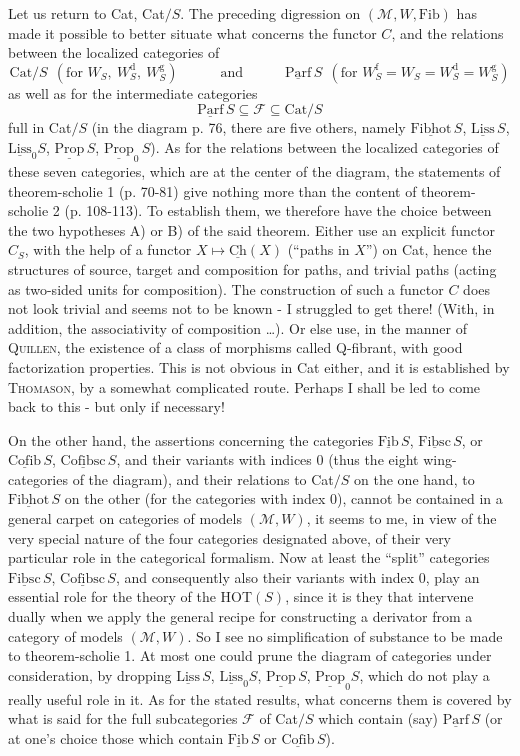 \documentclass[11pt]{article}
\newcommand{\printedpage}[1]{\marginpar{\footnotesize p.~#1}}
\newcommand{\msp}[1]{\marginpar{\footnotesize [#1]}}
\newcommand{\Fib}{\underline{\mathrm{Fib}}\,}
\newcommand{\Fibsc}{\underline{\mathrm{Fibsc}}\,}
\newcommand{\Cofib}{\underline{\mathrm{Cofib}}\,}
\newcommand{\Cofibsc}{\underline{\mathrm{Cofibsc}}\,}
\newcommand{\Fibhot}{\underline{\mathrm{Fibhot}}\,}
\newcommand{\Parf}{\underline{\mathrm{Parf}}\,}
\newcommand{\Liss}{\underline{\mathrm{Liss}}}
\newcommand{\Prop}{\underline{\mathrm{Prop}}}
\newcommand{\Cat}{\mathrm{Cat}}
\newcommand{\M}{\mathcal{M}}
\begin{document}
Let us return to Cat, Cat$/S$. The preceding digression on $(\M, W, \mathrm{Fib})$ has made it possible to better situate what concerns the functor $C$, and the relations between the localized categories of
\[\Cat/S \ \ (\text{for } W_S,\ W_S^{\mathrm{d}},\ W_S^{\mathrm{g}}) \qquad\quad \text{and} \qquad\quad \Parf S \ \ (\text{for } W_S^{\mathrm{f}} = W_S = W_S^{\mathrm{d}} = W_S^{\mathrm{g}})\]
as well as for the intermediate categories
\[\Parf S \subseteq \mathcal{F} \subseteq \Cat/S\]
full in Cat$/S$ (in the diagram p. 76, there are five others, namely $\Fibhot S$, $\Liss\,S$, $\Liss_0 S$, $\Prop\,S$, $\Prop_0\,S$). As for the relations between the localized categories of these seven categories, which are at the center of the diagram, the statements of theorem-scholie 1 (p. 70-81) give nothing more than the content of theorem-scholie 2 (p. 108-113). To establish them, we therefore have the choice between the two hypotheses A) or B) of the said theorem. Either use an explicit functor $C_S$, with the help of a
\msp{page 114}
functor $X \longmapsto \underline{\mathrm{Ch}}(X)$ (``paths in $X$'') on Cat, hence the structures of source, target and composition for paths, and trivial paths (acting as two-sided units for composition). The construction of such a functor $C$ does not look trivial and seems not to be known - I struggled to get there! (With, in addition, the associativity of composition \ldots). Or else use, in the manner of \textsc{Quillen}, the existence of a class of morphisms called Q-fibrant, with good factorization properties. This is not obvious in Cat either, and it is established by \textsc{Thomason}, by a somewhat complicated route. Perhaps I shall be led to come back to this - but only if necessary! %

On the other hand, the assertions concerning the categories $\Fib S$, $\Fibsc S$, or $\Cofib S$, $\Cofibsc S$, and their variants with indices 0 (thus the eight wing-categories of the diagram), and their relations to Cat$/S$ on the one hand, to $\Fibhot S$ on the other (for the categories with index 0), cannot be contained in a general carpet on categories of models $(\M, W)$, it seems to me, in view of the very special nature of the four categories designated above, of their very particular role in the categorical formalism. Now at least the ``split'' categories $\Fibsc S$, $\Cofibsc S$, and consequently also their variants with index 0, play an essential role for the theory of the HOT$(S)$, since it is they that
\msp{page 115}
intervene dually when we apply the general recipe for constructing a derivator from a category of models $(\M, W)$. So I see no simplification
\printedpage{72}
of substance to be made to theorem-scholie 1. At most one could prune the diagram of categories under consideration, by dropping $\Liss\,S$, $\Liss_0 S$, $\Prop\,S$, $\Prop_0 S$, which do not play a really useful role in it. As for the stated results, what concerns them is covered by what is said for the full subcategories $\mathcal{F}$ of Cat$/S$ which contain (say) $\Parf S$ (or at one's choice those which contain $\Fib S$ or $\Cofib S$).
\end{document}
